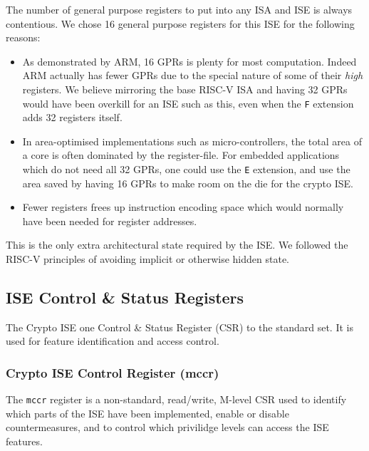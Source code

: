 
The number of general purpose registers to put into any ISA and ISE is
always contentious.
We chose 16 general purpose registers for this ISE for the following reasons:

\begin{itemize}
\item As demonstrated by ARM, 16 GPRs is plenty for most computation.
Indeed ARM actually has fewer GPRs due to the special nature of some of their
{\em high} registers.
We believe mirroring the base RISC-V ISA and having
32 GPRs would have been overkill for an ISE such as this, even when the
{\tt F} extension adds 32 registers itself.
\item In area-optimised implementations such as micro-controllers, the
total area of a core is often dominated by the register-file.
For embedded applications which do not need all 32 GPRs, one could use the 
{\tt E} extension, and use the area saved by having 16 GPRs to make room
on the die for the crypto ISE.
\item Fewer registers frees up instruction encoding space which would
normally have been needed for register addresses.
\end{itemize}

This is the only extra architectural state required by the ISE.
We followed the RISC-V principles of avoiding implicit or otherwise
hidden state.

\subsection{ISE Control \& Status Registers}

The Crypto ISE one Control \& Status Register (CSR) to the
standard set. It is used for feature identification and access
control.

\subsubsection{Crypto ISE Control Register (mccr)}
\label{sec:csr-mccr}

The {\tt mccr} register is a non-standard, read/write, M-level CSR
used to identify which parts of the ISE have been implemented,
enable or disable countermeasures, and to control which privilidge
levels can access the ISE features.

